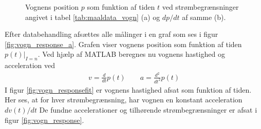 \begin{figure}
	\centering
	\caption[Vognens position $p(t)$ og hasighed $v(t)$]{Vognens position $p$ som funktion af tiden $t$ ved strømbegrænsninger angivet i tabel \ref{tab:maaldata_vogn} (a) og $dp/dt$ af samme (b).}
	\label{fig:vogn_respose_mes}
\end{figure}

Efter databehandling afsættes alle målinger i en graf som ses i figur \ref{fig:vogn_response_a}.
Grafen viser vognens position som funktion af tiden $p(t)|_{I=n}$.
Ved hjælp af MATLAB beregnes nu vognens hastighed og acceleration ved 
\begin{align}
v = \frac{d}{dt}p(t) \quad\quad a= \frac{d^2}{dt^2}p(t)
\end{align}
I figur \ref{fig:vogn_responsefit} er vognens hastighed afsat som funktion af tiden.
Her ses, at for hver strømbegrænsning, har vognen en konstant acceleration $dv(t)/dt$
De fundne accelerationer og tilhørende strømbegrænsninger er afsat i figur \ref{fig:vogn_response}.



